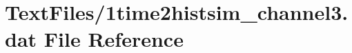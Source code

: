 \hypertarget{1time2histsim__channel3_8dat}{}\section{Text\+Files/1time2histsim\+\_\+channel3.dat File Reference}
\label{1time2histsim__channel3_8dat}
